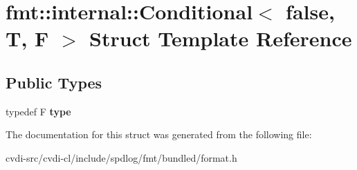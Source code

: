 \hypertarget{structfmt_1_1internal_1_1Conditional_3_01false_00_01T_00_01F_01_4}{}\section{fmt\+:\+:internal\+:\+:Conditional$<$ false, T, F $>$ Struct Template Reference}
\label{structfmt_1_1internal_1_1Conditional_3_01false_00_01T_00_01F_01_4}
\subsection*{Public Types}
\begin{DoxyCompactItemize}
\item 
typedef F {\bfseries type}\hypertarget{structfmt_1_1internal_1_1Conditional_3_01false_00_01T_00_01F_01_4_ac36f14451039cf3c26d853b93c9bf234}{}\label{structfmt_1_1internal_1_1Conditional_3_01false_00_01T_00_01F_01_4_ac36f14451039cf3c26d853b93c9bf234}

\end{DoxyCompactItemize}


The documentation for this struct was generated from the following file\+:\begin{DoxyCompactItemize}
\item 
cvdi-\/src/cvdi-\/cl/include/spdlog/fmt/bundled/format.\+h\end{DoxyCompactItemize}
